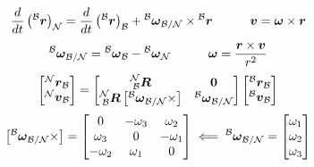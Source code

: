 \documentclass[twocolumn]{article}    %
\begin{document}
\begin{equation*}
    \frac{d}{dt} \left( \prescript{\mathcal{B}}{}{}{\bm{r}} \right)_{\mathcal{N}} = \frac{d}{dt}\left( \prescript{\mathcal{B}}{}{\bm{r}} \right)_{\mathcal{B}} + \prescript{\mathcal{B}}{}{\bm{\omega}}_{\mathcal{B}/\mathcal{N}} \times \prescript{\mathcal{B}}{}{\bm{r}} \hspace{30pt} \bm{v} = \bm{\omega} \times \bm{r}
\end{equation*}
\begin{equation*}
    \prescript{\mathcal{B}}{}{\bm{\omega}}_{\mathcal{B}/\mathcal{N}}  = \prescript{\mathcal{B}}{}{\bm{\omega}}_{\mathcal{B}} - \prescript{\mathcal{B}}{}{\bm{\omega}}_{\mathcal{N}}      \hspace{30pt} \bm{\omega} = \frac{\bm{r}\times \bm{v}}{r^2}
\end{equation*}
\begin{equation*}
    \begin{bmatrix}
        \prescript{\mathcal{N}}{}{\bm{r}}_{\mathcal{B}} \\ \prescript{\mathcal{N}}{}{\bm{v}}_{\mathcal{B}} 
    \end{bmatrix} = \begin{bmatrix}
        \prescript{\mathcal{N}}{\mathcal{B}}{\bm{R}} & \bm{0}\\
        \prescript{\mathcal{N}}{\mathcal{B}}{\bm{R}} \left[\prescript{\mathcal{B}}{}{\bm{\omega}}_{\mathcal{B}/\mathcal{N}} \times \right] & \prescript{\mathcal{B}}{}{\bm{\omega}}_{\mathcal{B}/\mathcal{N}} 
    \end{bmatrix} \begin{bmatrix}
        \prescript{\mathcal{B}}{}{\bm{r}}_{\mathcal{B}} \\ \prescript{\mathcal{B}}{}{\bm{v}}_{\mathcal{B}} 
    \end{bmatrix}
\end{equation*}
\begin{equation*}
     \left[\prescript{\mathcal{B}}{}{\bm{\omega}}_{\mathcal{B}/\mathcal{N}} \times \right] = \begin{bmatrix}
        0 & -\omega_3 & \omega_2\\ 
        \omega_3 & 0 & -\omega_1 \\
        -\omega_2 & \omega_1 & 0
    \end{bmatrix} \impliedby \prescript{\mathcal{B}}{}{\bm{\omega}}_{\mathcal{B}/\mathcal{N}} =\begin{bmatrix}
        \omega_1 \\ \omega_2 \\ \omega_3
    \end{bmatrix}
\end{equation*}
\end{document}
